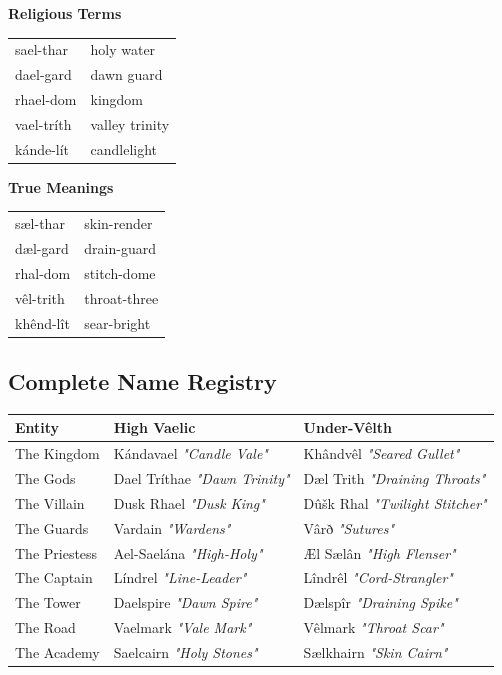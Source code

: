 \documentclass[11pt,a4paper,twoside]{book}
\begin{document}
\begin{multicols}{2}
\begin{tcolorbox}[heroicbox={High Vaelic}]
\textbf{Religious Terms}\\
\small
\begin{tabular}{ll}
sael-thar & holy water \\
dael-gard & dawn guard \\
rhael-dom & kingdom \\
vael-tríth & valley trinity \\
kánde-lít & candlelight \\
\end{tabular}
\end{tcolorbox}

\columnbreak

\begin{tcolorbox}[horrorbox={Under-Vêlth}]
\textbf{True Meanings}\\
\small
\begin{tabular}{ll}
sæl-thar & skin-render \\
dæl-gard & drain-guard \\
rhal-dom & stitch-dome \\
vêl-trith & throat-three \\
khênd-lît & sear-bright \\
\end{tabular}
\end{tcolorbox}
\end{multicols}

\subsection{Complete Name Registry}

\begin{adjustwidth}{0em}{0em}
\small
\begin{tabularx}{\textwidth}{X|X|X}
\textbf{Entity} & \textbf{High Vaelic} & \textbf{Under-Vêlth} \\
\hline
The Kingdom & Kándavael \textit{"Candle Vale"} & Khândvêl \textit{"Seared Gullet"} \\
The Gods & Dael Tríthae \textit{"Dawn Trinity"} & Dæl Trith \textit{"Draining Throats"} \\
The Villain & Dusk Rhael \textit{"Dusk King"} & Dûšk Rhal \textit{"Twilight Stitcher"} \\
The Guards & Vardain \textit{"Wardens"} & Vârð \textit{"Sutures"} \\
The Priestess & Ael-Saelána \textit{"High-Holy"} & Æl Sælân \textit{"High Flenser"} \\
The Captain & Líndrel \textit{"Line-Leader"} & Lîndrêl \textit{"Cord-Strangler"} \\
The Tower & Daelspire \textit{"Dawn Spire"} & Dælspîr \textit{"Draining Spike"} \\
The Road & Vaelmark \textit{"Vale Mark"} & Vêlmark \textit{"Throat Scar"} \\
The Academy & Saelcairn \textit{"Holy Stones"} & Sælkhairn \textit{"Skin Cairn"} \\
\end{tabularx}
\end{adjustwidth}
\end{document}
